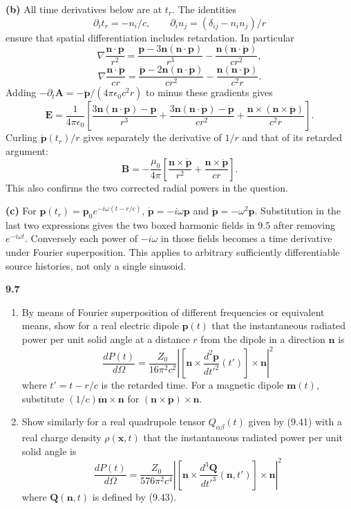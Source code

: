 \textbf{(b)} All time derivatives below are at $t_r$. The identities
\[
\partial_i t_r=-n_i/c,\qquad
\partial_i n_j=(\delta_{ij}-n_in_j)/r
\]
ensure that spatial differentiation includes retardation. In particular
\[
\nabla\frac{\mathbf n\cdot\mathbf p}{r^2}
=\frac{\mathbf p-3\mathbf n(\mathbf n\cdot\mathbf p)}{r^3}
-\frac{\mathbf n(\mathbf n\cdot\dot{\mathbf p})}{cr^2},
\]
\[
\nabla\frac{\mathbf n\cdot\dot{\mathbf p}}{cr}
=\frac{\dot{\mathbf p}-2\mathbf n(\mathbf n\cdot\dot{\mathbf p})}{cr^2}
-\frac{\mathbf n(\mathbf n\cdot\ddot{\mathbf p})}{c^2r}.
\]
Adding $-\partial_t\mathbf A=-\ddot{\mathbf p}/(4\pi\epsilon_0c^2r)$
to minus these gradients gives
\[
\boxed{\mathbf E=\frac1{4\pi\epsilon_0}\left[
\frac{3\mathbf n(\mathbf n\cdot\mathbf p)-\mathbf p}{r^3}
+\frac{3\mathbf n(\mathbf n\cdot\dot{\mathbf p})-\dot{\mathbf p}}{cr^2}
+\frac{\mathbf n\times(\mathbf n\times\ddot{\mathbf p})}{c^2r}\right].}
\]
Curling $\dot{\mathbf p}(t_r)/r$ gives separately the derivative of $1/r$
and that of its retarded argument:
\[
\boxed{\mathbf B=-\frac{\mu_0}{4\pi}\left[
\frac{\mathbf n\times\dot{\mathbf p}}{r^2}
+\frac{\mathbf n\times\ddot{\mathbf p}}{cr}\right].}
\]
This also confirms the two corrected radial powers in the question.

\textbf{(c)} For $\mathbf p(t_r)=\mathbf p_0e^{-i\omega(t-r/c)}$,
$\dot{\mathbf p}=-i\omega\mathbf p$ and
$\ddot{\mathbf p}=-\omega^2\mathbf p$. Substitution in the last two
expressions gives the two boxed harmonic fields in 9.5 after removing
$e^{-i\omega t}$. Conversely each power of $-i\omega$ in those fields
becomes a time derivative under Fourier superposition. This applies to
arbitrary sufficiently differentiable source histories, not only a
single sinusoid.

\par\bigskip
\noindent\textbf{9.7}\quad\begin{enumerate}
\item[(a)] By means of Fourier superposition of different frequencies or equivalent means, show for a real electric dipole $\mathbf{p}(t)$ that the instantaneous radiated power per unit solid angle at a distance $r$ from the dipole in a direction $\mathbf{n}$ is
\[
\frac{dP(t)}{d\Omega}=\frac{Z_{0}}{16\pi^{2}c^{2}}\left|\left[\mathbf{n}\times\frac{d^{2}\mathbf{p}}{dt'^{2}}(t')\right]\times\mathbf{n}\right|^{2}
\]
where $t'=t-r/c$ is the retarded time. For a magnetic dipole $\mathbf{m}(t)$, substitute $(1/c)\ddot{\mathbf{m}}\times\mathbf{n}$ for $(\mathbf{n}\times\ddot{\mathbf{p}})\times\mathbf{n}$.
\item[(b)] Show similarly for a real quadrupole tensor $Q_{\alpha\beta}(t)$ given by (9.41) with a real charge density $\rho(\mathbf{x},t)$ that the instantaneous radiated power per unit solid angle is
\[
\frac{dP(t)}{d\Omega}=\frac{Z_{0}}{576\pi^{2}c^{4}}\left|\left[\mathbf{n}\times\frac{d^{3}\mathbf{Q}}{dt'^{3}}(\mathbf{n},t')\right]\times\mathbf{n}\right|^{2}
\]
where $\mathbf{Q}(\mathbf{n},t)$ is defined by (9.43).
\end{enumerate}
\solution

